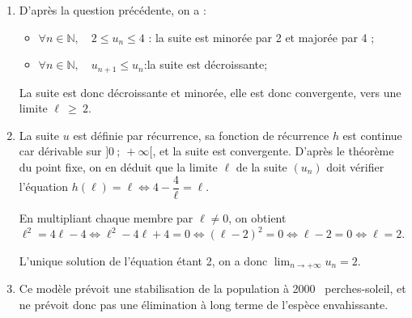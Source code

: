\documentclass[10pt]{article}
\providecommand{\N}{\mathbb{N}}
\providecommand{\np}[2][]{{#2~#1}}
\begin{document}
\begin{enumerate}
\begin{enumerate}
$2 \leqslant u_{n+1} \leqslant u_{n+2} \leqslant 4$ : $P_{n+1}$ est vraie.
















\textbf{Conclusion : } la relation est vraie au rang 0 et si elle est vraie au rang $n \geqslant 0$, elle l'est aussi au rang $n+1$ : d'après le principe de récurrence :
\[\forall n \in \N,\quad 2 \leqslant u_{n+1} \leqslant u_{n} \leqslant 4.\]

		\item D'après la question précédente, on a :

		\begin{itemize}
			\item $\forall n \in \N,\quad 2\leqslant u_n \leqslant 4$ : \quad la suite est minorée par 2 et majorée par 4 ;
			\item $\forall n \in \N,\quad u_{n+1} \leqslant u_{n}$:\quad la suite est décroissante;
		\end{itemize}

La suite est donc décroissante et minorée, elle est donc convergente, vers une limite $\ell~\geqslant~2$.



		\item La suite $u$ est définie par récurrence, sa fonction de récurrence $h$  est continue car dérivable sur $]0~;~+\infty[$, et la suite est  convergente. D'après le théorème du point fixe, on en déduit que la limite $\ell$  de la suite $(u_n)$ doit vérifier l'équation $h(\ell) = \ell \iff 4 - \dfrac{4}{\ell} = \ell$.











En multipliant chaque membre par $\ell \ne 0$, on obtient $\ell^2  = 4\ell  - 4 \iff \ell^2 - 4\ell + 4 = 0 \iff (\ell - 2)^2 = 0 \iff \ell - 2 = 0 \iff \ell = 2$.

L'unique solution de l'équation étant 2, on a donc $\displaystyle\lim_{n \to + \infty} u_n = 2$.




		\item Ce modèle prévoit une stabilisation de la population à \np{2000} perches-soleil, et ne prévoit donc pas une élimination à long terme de l'espèce envahissante.
	\end{enumerate}


\end{enumerate}
\end{document}
